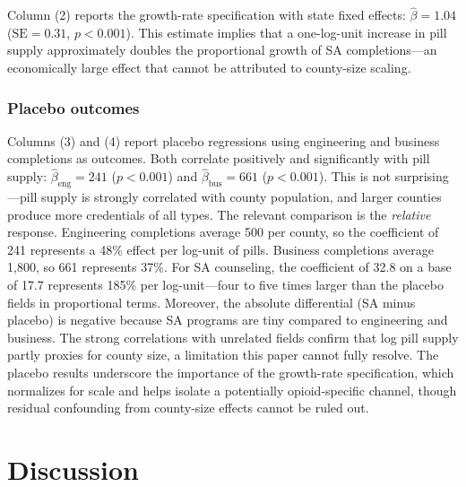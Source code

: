 \documentclass[12pt]{article}
\begin{document}
Column (2) reports the growth-rate specification with state fixed effects: $\hat{\beta} = 1.04$ ($\text{SE} = 0.31$, $p < 0.001$). This estimate implies that a one-log-unit increase in pill supply approximately doubles the proportional growth of SA completions---an economically large effect that cannot be attributed to county-size scaling.

\subsubsection*{Placebo outcomes} Columns (3) and (4) report placebo regressions using engineering and business completions as outcomes. Both correlate positively and significantly with pill supply: $\hat{\beta}_{\text{eng}} = 241$ ($p < 0.001$) and $\hat{\beta}_{\text{bus}} = 661$ ($p < 0.001$). This is not surprising---pill supply is strongly correlated with county population, and larger counties produce more credentials of all types. The relevant comparison is the \textit{relative} response. Engineering completions average 500 per county, so the coefficient of 241 represents a 48\% effect per log-unit of pills. Business completions average 1,800, so 661 represents 37\%. For SA counseling, the coefficient of 32.8 on a base of 17.7 represents 185\% per log-unit---four to five times larger than the placebo fields in proportional terms. Moreover, the absolute differential (SA minus placebo) is negative because SA programs are tiny compared to engineering and business. The strong correlations with unrelated fields confirm that log pill supply partly proxies for county size, a limitation this paper cannot fully resolve. The placebo results underscore the importance of the growth-rate specification, which normalizes for scale and helps isolate a potentially opioid-specific channel, though residual confounding from county-size effects cannot be ruled out.




\section{Discussion}
\end{document}

